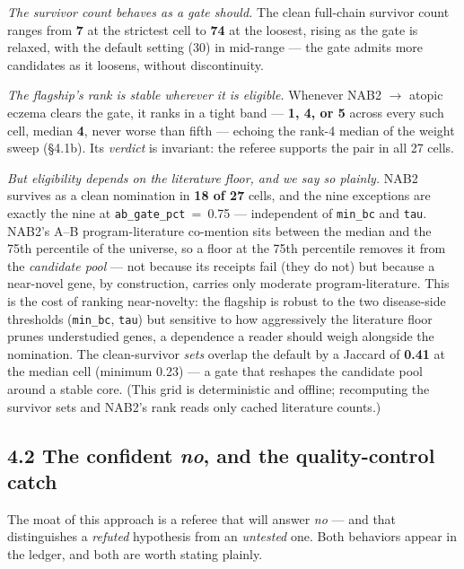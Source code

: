 \emph{The survivor count behaves as a gate should.} The clean full-chain survivor count ranges from
\textbf{7} at the strictest cell to \textbf{74} at the loosest, rising as the gate is relaxed, with the
default setting (30) in mid-range --- the gate admits more candidates as it loosens, without discontinuity.

\emph{The flagship's rank is stable wherever it is eligible.} Whenever NAB2 $\rightarrow$ atopic eczema clears
the gate, it ranks in a tight band --- \textbf{1, 4, or 5} across every such cell, median \textbf{4}, never
worse than fifth --- echoing the rank-4 median of the weight sweep (\S{}4.1b). Its \emph{verdict} is
invariant: the referee supports the pair in all 27 cells.

\emph{But eligibility depends on the literature floor, and we say so plainly.} NAB2 survives as a clean
nomination in \textbf{18 of 27} cells, and the nine exceptions are exactly the nine at
\texttt{ab\_gate\_pct}~=~0.75 --- independent of \texttt{min\_bc} and \texttt{tau}. NAB2's A--B program-literature
co-mention sits between the median and the 75th percentile of the universe, so a floor at the 75th percentile
removes it from the \emph{candidate pool} --- not because its receipts fail (they do not) but because a
near-novel gene, by construction, carries only moderate program-literature. This is the cost of
ranking near-novelty: the flagship is robust to the two disease-side thresholds (\texttt{min\_bc},
\texttt{tau}) but sensitive to how aggressively the literature floor prunes understudied genes, a dependence
a reader should weigh alongside the nomination. The clean-survivor \emph{sets} overlap the default by a
Jaccard of \textbf{0.41} at the median cell (minimum 0.23) --- a gate that reshapes the candidate pool around
a stable core. (This grid is deterministic and offline; recomputing the survivor sets and NAB2's rank reads
only cached literature counts.)

\subsection*{\texorpdfstring{4.2 The confident \emph{no}, and the quality-control catch}{4.2 The confident no, and the quality-control catch}}\label{the-confident-no-and-the-quality-control-catch}

The moat of this approach is a referee that will answer \emph{no} --- and that distinguishes a \emph{refuted}
hypothesis from an \emph{untested} one. Both behaviors appear in the ledger, and both are worth stating plainly.


